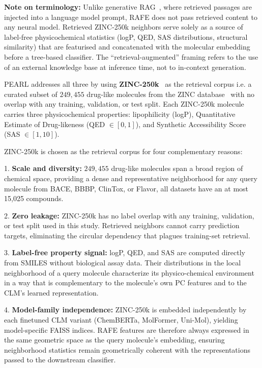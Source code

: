 \documentclass[pdflatex,sn-mathphys-num]{sn-jnl}%
\theoremstyle{thmstyleone}%
\theoremstyle{thmstyletwo}%
\theoremstyle{thmstylethree}%
\begin{document}
\noindent\textbf{Note on terminology:} Unlike generative RAG~\cite{lewis2020rag}, where retrieved passages are injected into a language model prompt, RAFE does not pass retrieved content to any neural model. Retrieved ZINC-250k neighbors serve solely as a source of label-free physicochemical statistics (logP, QED, SAS distributions, structural similarity) that are featurised and concatenated with the molecular embedding before a tree-based classifier. The ``retrieval-augmented'' framing refers to the use of an external knowledge base at inference time, not to in-context generation. 

PEARL addresses all three by using \textbf{ZINC-250k}~\cite{gomez2018automatic} as the retrieval corpus i.e. a curated subset of $249,455$ drug-like molecules from the ZINC database~\cite{irwin2020zinc20} with no overlap with
any training, validation, or test split. Each ZINC-250k molecule carries three physicochemical properties: lipophilicity (logP), Quantitative Estimate of Drug-likeness (QED $\in [0,1]$), and Synthetic Accessibility Score (SAS $\in [1,10]$).

ZINC-250k is chosen as the retrieval corpus for four complementary reasons: 

1. \textbf{Scale and diversity:} $249,455$ drug-like molecules span a broad region of chemical space, providing a dense and representative neighborhood for any query molecule from BACE, BBBP, ClinTox, or Flavor, all datasets have an at most 15,025 compounds.

2. \textbf{Zero leakage:} ZINC-250k has no label overlap with any training, validation, or test split used in this study. Retrieved neighbors cannot carry prediction targets, eliminating the circular dependency that plagues training-set retrieval.

3. \textbf{Label-free property signal:} logP, QED, and SAS are computed directly from SMILES without biological assay data. Their distributions in the local neighborhood of a query molecule characterize its physico-chemical environment in a way that is complementary to the molecule's own PC features and to the CLM's learned representation.

4. \textbf{Model-family independence:} ZINC-250k is embedded independently by each finetuned CLM variant (ChemBERTa, MolFormer, Uni-Mol), yielding model-specific FAISS indices. RAFE features are therefore always expressed in the same geometric space as the query molecule's embedding, ensuring neighborhood statistics remain geometrically coherent with the representations passed to the downstream classifier.
\end{document}
